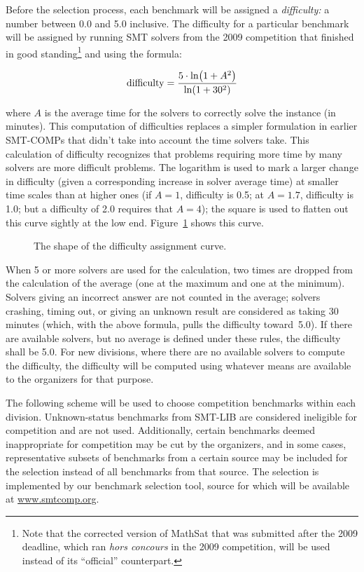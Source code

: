 \documentclass[12pt]{article}
\begin{document}
Before the selection process, each benchmark will be assigned a
\emph{difficulty:} a number between 0.0 and 5.0 inclusive.  The
difficulty for a particular benchmark will be assigned by running SMT
solvers from the 2009 competition that finished in good
standing\footnote{Note that the corrected version of MathSat that was
  submitted after the 2009 deadline, which ran \textit{hors concours}
  in the 2009 competition, will be used instead of its ``official''
  counterpart.} and using the formula:

\[\mathrm{difficulty} = {5\cdot\ln\!\left(1+A^2\right) \over \ln\!\left(1+30^2\right)}\]

\noindent
where $A$ is the average time for the solvers to correctly solve the
instance (in minutes).  This computation of difficulties
replaces a simpler formulation in earlier SMT-COMPs that didn't take
into account the time solvers take.  This calculation of difficulty
recognizes that problems requiring more time by many solvers are
more difficult problems.  The logarithm is used to
mark a larger change in difficulty (given a corresponding increase in
solver average time) at smaller time scales than at higher ones (if $A=1$,
difficulty is 0.5; at $A=1.7$, difficulty is 1.0; but a difficulty of 2.0
requires that $A=4$); the square is used to flatten out this curve sightly
at the low end.  Figure~\ref{difficultyplot} shows this curve.

\begin{figure}
  \centerline{}
  \caption{The shape of the difficulty assignment curve.}
  \label{difficultyplot}
\end{figure}

When 5 or more solvers are used for the
calculation, two times are dropped from the calculation of the average
(one at the maximum and one at the minimum).  Solvers giving an
incorrect answer are not counted in the average; solvers crashing,
timing out, or giving an unknown result are considered as taking 30
minutes (which, with the above formula, pulls the difficulty
toward~5.0).  If there are available solvers, but no average is
defined under these rules, the difficulty shall be 5.0.  For new
divisions, where there are no available solvers to compute the
difficulty, the difficulty will be computed using whatever means are
available to the organizers for that purpose.

The following scheme will be used to choose competition benchmarks
within each division.  Unknown-status benchmarks from SMT-LIB are
considered ineligible for competition and are not used.
%
Additionally, certain benchmarks deemed inappropriate for competition
may be cut by the organizers, and in some cases, representative subsets
of benchmarks from a certain source may be included for the selection
instead of all benchmarks from that source.
%
The selection
is implemented by our benchmark selection tool, source for which will
be available at \url{www.smtcomp.org}.
\end{document}
